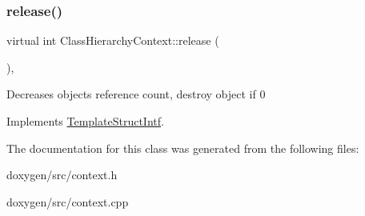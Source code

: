 \mbox{\label{class_class_hierarchy_context_a96c1871a3b349869f62b6c5d1e36759f}} 
\subsubsection{\texorpdfstring{release()}{release()}}
{\footnotesize\ttfamily virtual int Class\+Hierarchy\+Context\+::release (\begin{DoxyParamCaption}{ }\end{DoxyParamCaption})\hspace{0.3cm}{\ttfamily [inline]}, {\ttfamily [virtual]}}

Decreases object\textquotesingle{}s reference count, destroy object if 0 

Implements \mbox{\hyperlink{class_template_struct_intf_a3dce7dd29d3f66a8080b40578e8a5045}{Template\+Struct\+Intf}}.



The documentation for this class was generated from the following files\+:\begin{DoxyCompactItemize}
\item 
doxygen/src/context.\+h\item 
doxygen/src/context.\+cpp\end{DoxyCompactItemize}
